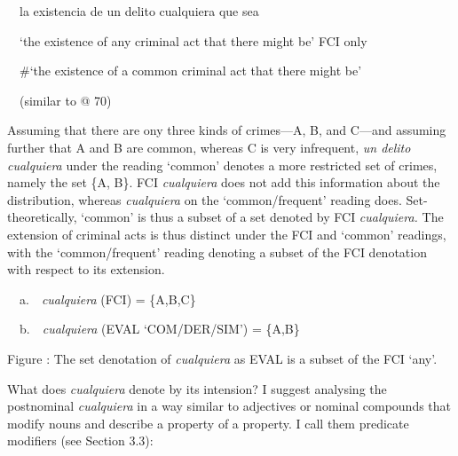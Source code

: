 \begin{styleStandard}
\ \ la existencia de un delito cualquiera que sea
\end{styleStandard}

\begin{styleStandard}
\ \ ‘the existence of any criminal act that there might be’ FCI only
\end{styleStandard}

\begin{styleStandard}
\ \ \#‘the existence of a common criminal act that there might be’\ \ 
\end{styleStandard}

\begin{styleStandard}
\ \ (similar to @ 70)
\end{styleStandard}

\begin{styleStandard}
Assuming that there are ony three kinds of crimes—A, B, and C—and assuming further that A and B are common, whereas C is very infrequent, \textit{un delito cualquiera} under the reading ‘common’ denotes a more restricted set of crimes, namely the set \{A, B\}. FCI \textit{cualquiera} does not add this information about the distribution, whereas \textit{cualquiera} on the ‘common/frequent’ reading does. Set-theoretically, ‘common’ is thus a subset of a set denoted by FCI \textit{cualquiera. }The extension of criminal acts is thus distinct under the FCI and ‘common’ readings, with the ‘common/frequent’ reading denoting a subset of the FCI denotation with respect to its extension.
\end{styleStandard}

\begin{styleStandard}
\ \ a.\ \ \textit{cualquiera} (FCI) = \{A,B,C\}
\end{styleStandard}

\begin{styleStandard}
\ \ b.\ \ \textit{cualquiera} (EVAL ‘COM/DER/SIM’) = \{A,B\}
\end{styleStandard}

\begin{styletablecaption}
Figure : The set denotation of \textit{cualquiera} as EVAL is a subset of the FCI ‘any’.
\end{styletablecaption}

\begin{styleStandard}
What does \textit{cualquiera} denote by its intension? I suggest analysing the postnominal \textit{cualquiera} in a way similar to adjectives or nominal compounds that modify nouns and describe a property of a property. I call them predicate modifiers (see Section 3.3):
\end{styleStandard}

